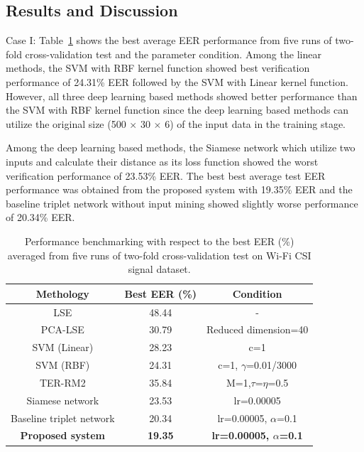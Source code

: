 \documentclass[runningheads]{llncs}
\begin{document}
\subsection{Results and Discussion}

Case I: Table~\ref{tab3} shows the best average EER performance from five runs of two-fold cross-validation test and the parameter condition. Among the linear methods, the SVM with RBF kernel function showed best verification performance of 24.31\% EER followed by the SVM with Linear kernel function. However, all three deep learning based methods showed better performance than the SVM with RBF kernel function since the deep learning based methods can utilize the original size (500 $\times$ 30 $\times$ 6) of the input data in the training stage.

Among the deep learning based methods, the Siamese network which utilize two inputs and calculate their distance as its loss function showed the worst verification performance of 23.53\% EER. The best best average test EER performance was obtained from the proposed system with 19.35\% EER and the baseline triplet network without input mining showed slightly worse performance of 20.34\% EER.

\begin{table}[!h]
    \caption{Performance benchmarking with respect to the best EER (\%) averaged from five runs of two-fold cross-validation test on Wi-Fi CSI signal dataset.}\label{tab3}
    \centering
    \begin{tabular}{|c|c|c|}
    \hline
    Methology   &   Best EER (\%) &   Condition   \\  \hline
    LSE &   48.44   &  - \\ 
    PCA-LSE    &   30.79   &  Reduced dimension=40    \\
    SVM (Linear) &   28.23   &   c=1 \\
    SVM (RBF)    &   24.31   &   c=1, $\gamma$=0.01/3000 \\
    TER-RM2 &   35.84   &  M=1,$\tau$=$\eta$=0.5   \\     \hline
    Siamese network  &   23.53   &   lr=0.00005  \\
    Baseline triplet network &   20.34   &   lr=0.00005, $\alpha$=0.1  \\
    \textbf{Proposed system} &   \textbf{19.35}   &  \textbf{lr=0.00005, $\alpha$=0.1}  \\
     \hline
    \end{tabular}
\end{table}
\end{document}

